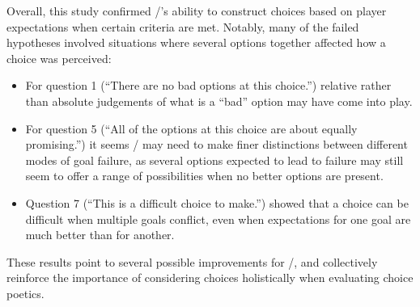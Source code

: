 Overall, this study confirmed \dunyazad/'s ability to construct choices based on player expectations when certain criteria are met.
%
Notably, many of the failed hypotheses involved situations where several options together affected how a choice was perceived:
%
\begin{itemize}
  \item For question 1 (``There are no bad options at this choice.'') relative rather than absolute judgements of what is a ``bad'' option may have come into play.
  \item For question 5 (``All of the options at this choice are about equally promising.'') it seems \dunyazad/ may need to make finer distinctions between different modes of goal failure, as several options expected to lead to failure may still seem to offer a range of possibilities when no better options are present.
  \item Question 7 (``This is a difficult choice to make.'') showed that a choice can be difficult when multiple goals conflict, even when expectations for one goal are much better than for another.
\end{itemize}
%
These results point to several possible improvements for \dunyazad/, and collectively reinforce the importance of considering choices holistically when evaluating choice poetics.


